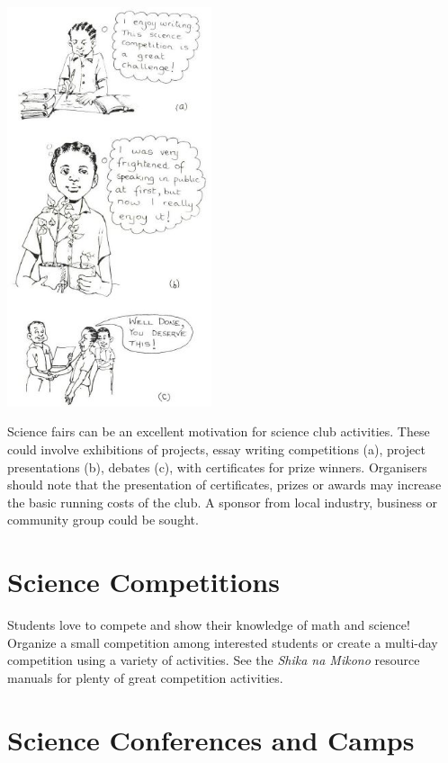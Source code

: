 \begin{multicols}{2}
\begin{center}
\includegraphics[width=0.45\textwidth]{./img/source/science-fairs.jpg}
\end{center}

Science fairs can be an excellent motivation
for science club activities. These could involve
exhibitions of projects, essay writing
competitions (a), project presentations (b),
debates (c), with certificates for prize winners.
Organisers should note that the presentation of
certificates, prizes or awards may increase the
basic running costs of the club. A sponsor from
local industry, business or community group
could be sought.

\section{Science Competitions}

Students love to compete and show their knowledge of math and science! Organize a small competition among interested students or create a multi-day competition using a variety of activities. See the \emph{Shika na Mikono} resource manuals for plenty of great competition activities.


\section{Science Conferences and Camps}


\end{multicols}
